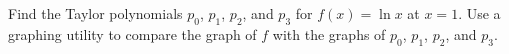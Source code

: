 \documentclass{report}
\begin{document}
    \begin{exm}
        Find the Taylor polynomials $p_0$, $p_1$, $p_2$, and $p_3$ for $f(x) = \ln x$ at $x=1$. Use a graphing utility to compare the graph of $f$ with the graphs of $p_0$, $p_1$, $p_2$, and $p_3$.
    \end{exm}
    
    

    
    

    
    

    
    


    

    

    
    




    
    


        
        


    


    
    
    
    
\end{document}

